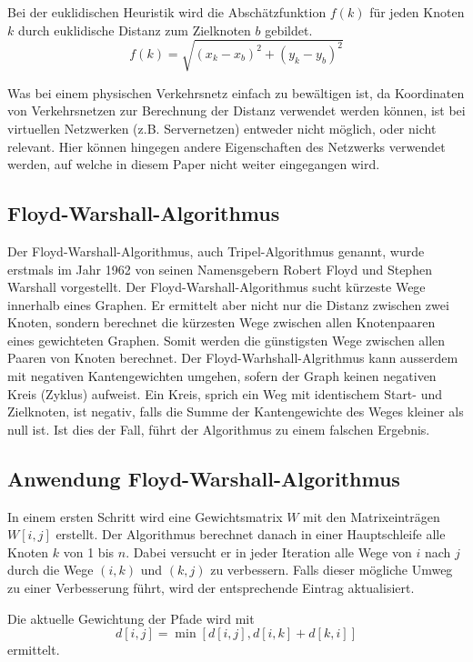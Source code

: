 Bei der euklidischen Heuristik wird die Abschätzfunktion $f(k)$ für jeden Knoten $k$ durch euklidische Distanz zum Zielknoten $b$ gebildet.
\begin{equation}
f(k)=\sqrt{(x_k-x_b)^2+(y_k-y_b)^2}
\end{equation}

Was bei einem physischen Verkehrsnetz einfach zu bewältigen ist, da Koordinaten von Verkehrsnetzen zur Berechnung der Distanz verwendet werden können, ist bei virtuellen Netzwerken (z.B. Servernetzen) entweder nicht möglich, oder nicht relevant. Hier können hingegen andere Eigenschaften des Netzwerks verwendet werden, auf welche in diesem Paper nicht weiter eingegangen wird.

\subsection{Floyd-Warshall-Algorithmus}
Der Floyd-Warshall-Algorithmus, auch Tripel-Algorithmus genannt, wurde erstmals im Jahr 1962 von seinen Namensgebern Robert Floyd und Stephen Warshall vorgestellt.
Der Floyd-Warshall-Algorithmus sucht kürzeste Wege innerhalb eines Graphen. Er ermittelt aber nicht nur die Distanz zwischen zwei Knoten, sondern berechnet die kürzesten Wege zwischen allen Knotenpaaren eines gewichteten Graphen. Somit werden die günstigsten Wege zwischen allen Paaren von Knoten berechnet. Der Floyd-Warhshall-Algrithmus kann ausserdem mit negativen Kantengewichten umgehen, sofern der Graph keinen negativen Kreis (Zyklus) aufweist. Ein Kreis, sprich ein Weg mit identischem Start- und Zielknoten, ist negativ, falls die Summe der Kantengewichte des Weges kleiner als null ist. Ist dies der Fall, führt der Algorithmus zu einem falschen Ergebnis.

\subsection{Anwendung Floyd-Warshall-Algorithmus}

In einem ersten Schritt wird eine Gewichtsmatrix $W$ mit den Matrixeinträgen $W[i, j]$ erstellt.
Der Algorithmus berechnet danach in einer Hauptschleife alle Knoten $k$ von 1 bis $n$.
Dabei versucht er in jeder Iteration alle Wege von $i$ nach $j$ durch die Wege $(i, k)$ und $(k, j)$ zu verbessern.
Falls dieser mögliche Umweg zu einer Verbesserung führt, wird der entsprechende Eintrag aktualisiert.

Die aktuelle Gewichtung der Pfade wird mit
\begin{equation}d[i, j]=\min[d[i,j], d[i,k] + d[k,i]]\end{equation}
ermittelt.



